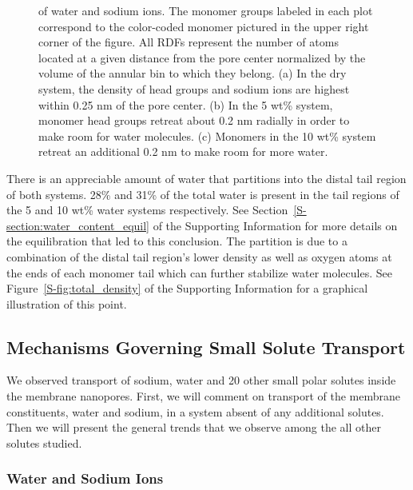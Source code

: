 \documentclass[journal=jpcbfk,manuscript=article]{achemso}
\begin{document}
\begin{figure}[!htb]
{  of water and sodium ions. The monomer groups labeled in each plot correspond to 
  the color-coded monomer pictured in the upper right corner of the figure. 
  All RDFs represent the number of atoms located at a given distance from the
  pore center normalized by the volume of the annular bin to which they belong.
  (a) In the dry system, the density of head groups and sodium ions are highest
  within 0.25 nm of the pore center. (b) In the 5 wt\% system, monomer head 
  groups retreat about 0.2 nm radially in order to make room for water molecules.
  (c) Monomers in the 10 wt\% system retreat an additional 0.2 nm to make room
  for more water.}\label{fig:component_densities}
  \end{figure}
  
  There is an appreciable amount of water that partitions into the distal tail %
  region of both systems. 28\% and 31\% of the total water is present in the
  tail regions of the 5 and 10 wt\% water systems respectively. See 
  Section~\ref{S-section:water_content_equil} of the Supporting Information 
  for more details on the equilibration that led to this conclusion. The partition
  is due to a combination of the distal tail region's lower density as well
  as oxygen atoms at the ends of each monomer tail which can further stabilize
  water molecules. See Figure~\ref{S-fig:total_density} of the Supporting 
  Information for a graphical illustration of this point.

  \subsection{Mechanisms Governing Small Solute Transport}\label{section:mechanism_overview} 

  We observed transport of sodium, water and 20 other small polar solutes
  inside the membrane nanopores. First, we will comment on transport of the
  membrane constituents, water and sodium, in a system absent of any additional
  solutes. Then we will present the general trends that we observe among the
  all other solutes studied.
  
  \subsubsection{Water and Sodium Ions}\label{section:transport_water_sodium} 
\end{document}

